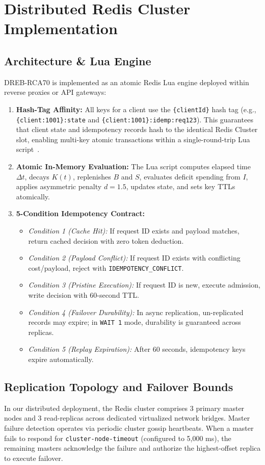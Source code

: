 \documentclass[conference]{IEEEtran}
\begin{document}
\section{Distributed Redis Cluster Implementation}

\subsection{Architecture \& Lua Engine}
DREB-RCA70 is implemented as an atomic Redis Lua engine deployed within reverse proxies or API gateways:
\begin{enumerate}
    \item \textbf{Hash-Tag Affinity:} All keys for a client use the \texttt{\{clientId\}} hash tag (e.g., \texttt{\{client:1001\}:state} and \texttt{\{client:1001\}:idemp:req123}). This guarantees that client state and idempotency records hash to the identical Redis Cluster slot, enabling multi-key atomic transactions within a single-round-trip Lua script~\cite{redisclusterspec}.
    \item \textbf{Atomic In-Memory Evaluation:} The Lua script computes elapsed time $\Delta t$, decays $K(t)$, replenishes $B$ and $S$, evaluates deficit spending from $I$, applies asymmetric penalty $d=1.5$, updates state, and sets key TTLs atomically.
    \item \textbf{5-Condition Idempotency Contract:}
    \begin{itemize}
        \item \textit{Condition 1 (Cache Hit):} If request ID exists and payload matches, return cached decision with zero token deduction.
        \item \textit{Condition 2 (Payload Conflict):} If request ID exists with conflicting cost/payload, reject with \texttt{IDEMPOTENCY\_CONFLICT}.
        \item \textit{Condition 3 (Pristine Execution):} If request ID is new, execute admission, write decision with 60-second TTL.
        \item \textit{Condition 4 (Failover Durability):} In async replication, un-replicated records may expire; in \texttt{WAIT 1} mode, durability is guaranteed across replicas.
        \item \textit{Condition 5 (Replay Expiration):} After 60 seconds, idempotency keys expire automatically.
    \end{itemize}
\end{enumerate}

\subsection{Replication Topology and Failover Bounds}
In our distributed deployment, the Redis cluster comprises 3 primary master nodes and 3 read-replicas across dedicated virtualized network bridges. Master failure detection operates via periodic cluster gossip heartbeats. When a master fails to respond for \texttt{cluster-node-timeout} (configured to 5,000 ms), the remaining masters acknowledge the failure and authorize the highest-offset replica to execute failover.
\end{document}
